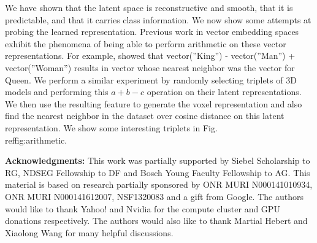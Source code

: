 \documentclass[runningheads]{llncs}
\begin{document}
We have shown that the latent space is reconstructive and smooth, that it is
predictable, and that it carries class information. We now show some attempts
at probing the learned representation.
Previous work in vector embedding spaces~\cite{Radford_arxiv16,Mikolov_NIPS13} exhibit the phenomena of 
being able to perform arithmetic on these vector representations. For example, \cite{Mikolov_NIPS13} showed that
vector(”King”) - vector(”Man”) + vector(”Woman”) results in vector whose nearest neighbor was the 
vector for Queen.
We perform a similar experiment by randomly selecting 
triplets of 3D models and performing this $a+b-c$ operation on their latent representations. We then use the resulting 
feature to generate the voxel representation and also find the nearest neighbor in the dataset over 
cosine distance on this latent representation. We show some interesting
triplets in Fig.\\ref{fig:arithmetic}.


{\small
\noindent \textbf{Acknowledgments:}
This work was partially supported by
Siebel Scholarship to RG, NDSEG Fellowship to DF and Bosch Young Faculty Fellowship to AG.
This material is based on research partially sponsored by ONR MURI N000141010934, ONR
MURI N000141612007, NSF1320083 and a gift from Google. The authors would like to thank Yahoo!
and Nvidia for the compute cluster and GPU donations respectively.
The authors would also like to thank Martial Hebert and Xiaolong Wang for many helpful discussions.
}

\clearpage





\end{document}
